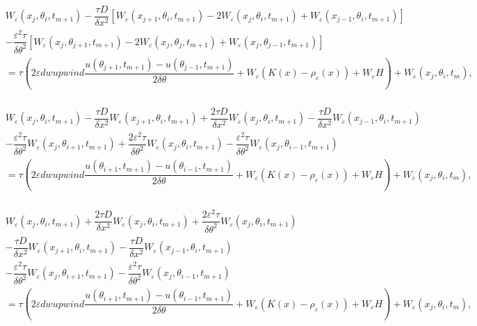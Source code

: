 \documentclass[preprint]{article}
\numberwithin{equation}{section}
\begin{document}
 \begin{equation}
\begin{aligned}
& W_\varepsilon(x_j, \theta_i, t_{m+1}) -\dfrac{\tau D}{\delta x^2}[W_\varepsilon(x_{j+1},\theta_i, t_{m+1}) - 2W_\varepsilon(x_j,\theta_i,t_{m+1}) + W_\varepsilon(x_{j-1}, \theta_i, t_{m+1})] \\
&-\dfrac{\varepsilon^2\tau}{\delta\theta^2}[W_\varepsilon(x_j,\theta_{j+1},t_{m+1})-2W_\varepsilon(x_j,\theta_{j}, t_{m+1})+W_\varepsilon(x_j,\theta_{j-1}, t_{m+1})] \\
&= \tau(2\varepsilon dwupwind\dfrac{u(\theta_{j+1},t_{m+1}) -u(\theta_{j-1},t_{m+1})}{2\delta\theta}
+ W_\varepsilon (K(x)-\rho_\varepsilon(x)) + W_\varepsilon H) + W_\varepsilon(x_j, \theta_i, t_m),\\
\end{aligned}
\end{equation}

 \begin{equation}
\begin{aligned}
& W_\varepsilon(x_j, \theta_i, t_{m+1}) -\dfrac{\tau D}{\delta x^2}W_\varepsilon(x_{j+1},\theta_i, t_{m+1}) + \dfrac{2\tau D}{\delta x^2} W_\varepsilon(x_j,\theta_i,t_{m+1}) -\dfrac{\tau D}{\delta x^2} W_\varepsilon(x_{j-1}, \theta_i, t_{m+1}) \\
&-\dfrac{\varepsilon^2\tau}{\delta\theta^2}W_\varepsilon(x_j,\theta_{i+1},t_{m+1})+\dfrac{2\varepsilon^2\tau}{\delta\theta^2}W_\varepsilon(x_j,\theta_{i}, t_{m+1})-\dfrac{\varepsilon^2\tau}{\delta\theta^2}W_\varepsilon(x_j,\theta_{i-1}, t_{m+1}) \\
&= \tau(2\varepsilon dwupwind\dfrac{u(\theta_{i+1},t_{m+1}) -u(\theta_{i-1},t_{m+1})}{2\delta\theta}
+ W_\varepsilon (K(x)-\rho_\varepsilon(x)) + W_\varepsilon H) + W_\varepsilon(x_j, \theta_i, t_m),\\
\end{aligned}
\end{equation}

 \begin{equation}
\begin{aligned}
& W_\varepsilon(x_j, \theta_i, t_{m+1}) + \dfrac{2\tau D}{\delta x^2} W_\varepsilon(x_j,\theta_i,t_{m+1}) +\dfrac{2\varepsilon^2\tau}{\delta\theta^2}W_\varepsilon(x_j,\theta_{i}, t_{m+1})\\
 & -\dfrac{\tau D}{\delta x^2}W_\varepsilon(x_{j+1},\theta_i, t_{m+1}) -\dfrac{\tau D}{\delta x^2} W_\varepsilon(x_{j-1}, \theta_i, t_{m+1}) \\
&-\dfrac{\varepsilon^2\tau}{\delta\theta^2}W_\varepsilon(x_j,\theta_{i+1},t_{m+1})-\dfrac{\varepsilon^2\tau}{\delta\theta^2}W_\varepsilon(x_j,\theta_{i-1}, t_{m+1}) \\
&= \tau(2\varepsilon dwupwind\dfrac{u(\theta_{i+1},t_{m+1}) -u(\theta_{i-1},t_{m+1})}{2\delta\theta}
+ W_\varepsilon (K(x)-\rho_\varepsilon(x)) + W_\varepsilon H) + W_\varepsilon(x_j, \theta_i, t_m),\\
\end{aligned}
\end{equation}
\end{document}

